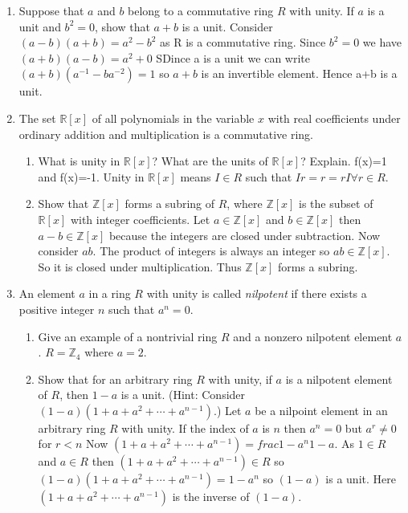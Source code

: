 \documentclass{article}
\newcommand{\ZZ}{\mathbb{Z}}
\newcommand{\RR}{\mathbb{R}}
\begin{document}
\begin{enumerate}
     \item Suppose that $a$ and $b$ belong to a commutative ring $R$ with unity. If $a$ is a unit and $b^2=0$, show that $a+b$ is a unit.
     Consider $(a-b)(a+b)=a^{2}-b^{2}$ as R is a commutative ring. Since $b^{2}=0$ we have $(a+b)(a-b)=a^{2}+0$ SDince a is a unit we can write $(a+b)(a^{-1}-ba^{-2})=1$ so $a+b$ is an invertible element. Hence a+b is a unit. 

     \item The set $\RR[x]$ of all polynomials in the variable $x$ with real coefficients under ordinary addition and multiplication is a commutative ring.
     \begin{enumerate}
        \item What is unity in $\RR[x]$? What are the units of $\RR[x]$? Explain. 
        f(x)=1 and f(x)=-1. Unity in $\RR[x]$ means $I\in R$ such that $Ir=r=rI \forall r \in R$.

        \item Show that $\ZZ[x]$ forms a subring of $R$, where $\ZZ[x]$ is the subset of $\RR[x]$ with integer coefficients. 
        Let $a\in \ZZ[x]$ and $b \in \ZZ[x]$ then $a-b \in \ZZ[x]$ because the integers are closed under subtraction. Now consider $ab$. The product of integers is always an integer so $ab\in\ZZ[x]$. So it is closed under multiplication. Thus $\ZZ[x]$ forms a subring. 

     \end{enumerate}


    \item An element $a$ in a ring $R$ with unity is called \emph{nilpotent} if there exists a positive integer $n$ such that $a^n=0$. 
    \begin{enumerate}
        \item Give an example of a nontrivial ring $R$ and a nonzero nilpotent element $a$.
        $R=\ZZ_{4}$ where $a=2$.

        \item Show that for an arbitrary ring $R$ with unity, if $a$ is a nilpotent element of $R$, then $1-a$ is a unit. (Hint: Consider $(1-a)(1+a+a^2+\cdots + a^{n-1})$.)
        Let $a$ be a nilpoint element in an arbitrary ring $R$ with unity. If the index of $a$ is $n$ then $a^{n}=0$ but $a^r \neq 0$ for $r<n$ Now $(1+a+a^2+\cdots + a^{n-1})=frac{1-a^{n}}{1-a}$. As $1\in R$ and $a\in R$ then $(1+a+a^2+\cdots + a^{n-1})\in R$ so $(1-a)(1+a+a^2+\cdots + a^{n-1})=1-a^{n}$ so $(1-a)$ is a unit. Here $(1+a+a^2+\cdots + a^{n-1})$ is the inverse of $(1-a)$.


\end{enumerate}
\end{enumerate}
\end{document}
